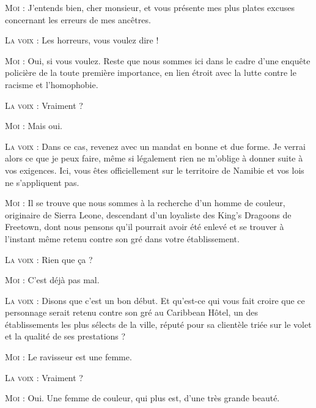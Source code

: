 \begin{dialogue}
\textsc{Moi} : J’entends bien, cher monsieur, et vous présente mes plus plates excuses concernant les erreurs de mes ancêtres.

\textsc{La voix} : Les horreurs, vous voulez dire !

\textsc{Moi} : Oui, si vous voulez. Reste que nous sommes ici dans le cadre d’une enquête policière de la toute première importance, en lien étroit avec la lutte contre le racisme et l’homophobie.

%
%
%
\textsc{La voix} : Vraiment ?

\textsc{Moi} : Mais oui.

\textsc{La voix} : Dans ce cas, revenez avec un mandat en bonne et due forme. Je verrai alors ce que je peux faire, même si légalement rien ne m’oblige à donner suite à vos exigences. Ici, vous êtes officiellement sur le territoire de Namibie et vos lois ne s’appliquent pas.

\textsc{Moi} : Il se trouve que nous sommes à la recherche d’un homme de couleur, originaire de Sierra Leone, descendant d’un loyaliste des King’s Dragoons de Freetown, dont nous pensons qu’il pourrait avoir été enlevé et se trouver à l’instant même retenu contre son gré dans votre établissement.

\textsc{La voix} : Rien que ça ?

\textsc{Moi} : C’est déjà pas mal.

\illusloflabel{}%
\textsc{La voix} : Disons que c’est un bon début. Et qu’est-ce qui vous fait croire que ce personnage serait retenu contre son gré au Caribbean Hôtel, un des établissements les plus sélects de la ville, réputé pour sa clientèle triée sur le volet et la qualité de ses prestations ?

\textsc{Moi} : Le ravisseur est une femme.

\textsc{La voix} : Vraiment ?

\textsc{Moi} : Oui. Une femme de couleur, qui plus est, d’une très grande beauté.


\end{dialogue}
